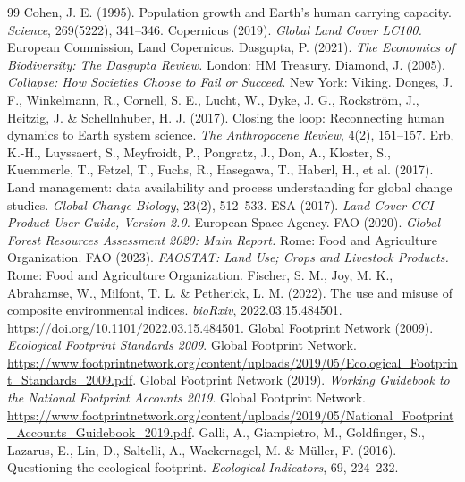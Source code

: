 \documentclass[11pt,a4paper]{article}
\begin{document}
\begin{thebibliography}{99}
 Cohen, J. E. (1995). Population growth and Earth's human carrying capacity. \emph{Science}, 269(5222), 341--346.
 Copernicus (2019). \emph{Global Land Cover LC100.} European Commission, Land Copernicus.
 Dasgupta, P. (2021). \emph{The Economics of Biodiversity: The Dasgupta Review.} London: HM Treasury.
 Diamond, J. (2005). \emph{Collapse: How Societies Choose to Fail or Succeed.} New York: Viking.
 Donges, J. F., Winkelmann, R., Cornell, S. E., Lucht, W., Dyke, J. G., Rockstr\"om, J., Heitzig, J. \& Schellnhuber, H. J. (2017). Closing the loop: Reconnecting human dynamics to Earth system science. \emph{The Anthropocene Review}, 4(2), 151--157.
 Erb, K.-H., Luyssaert, S., Meyfroidt, P., Pongratz, J., Don, A., Kloster, S., Kuemmerle, T., Fetzel, T., Fuchs, R., Hasegawa, T., Haberl, H., et al. (2017). Land management: data availability and process understanding for global change studies. \emph{Global Change Biology}, 23(2), 512--533.
 ESA (2017). \emph{Land Cover CCI Product User Guide, Version 2.0.} European Space Agency.
 FAO (2020). \emph{Global Forest Resources Assessment 2020: Main Report.} Rome: Food and Agriculture Organization.
 FAO (2023). \emph{FAOSTAT: Land Use; Crops and Livestock Products.} Rome: Food and Agriculture Organization.
 Fischer, S. M., Joy, M. K., Abrahamse, W., Milfont, T. L. \& Petherick, L. M. (2022). The use and misuse of composite environmental indices. \emph{bioRxiv}, 2022.03.15.484501. \url{https://doi.org/10.1101/2022.03.15.484501}.
 Global Footprint Network (2009). \emph{Ecological Footprint Standards 2009}. Global Footprint Network. \url{https://www.footprintnetwork.org/content/uploads/2019/05/Ecological_Footprint_Standards_2009.pdf}.
 Global Footprint Network (2019). \emph{Working Guidebook to the National Footprint Accounts 2019}. Global Footprint Network. \url{https://www.footprintnetwork.org/content/uploads/2019/05/National_Footprint_Accounts_Guidebook_2019.pdf}.
 Galli, A., Giampietro, M., Goldfinger, S., Lazarus, E., Lin, D., Saltelli, A., Wackernagel, M. \& M\"uller, F. (2016). Questioning the ecological footprint. \emph{Ecological Indicators}, 69, 224--232.

\end{thebibliography}
\end{document}
